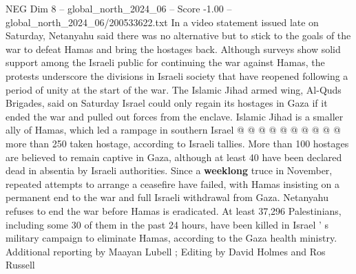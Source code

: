 \begin{textsample}{NEG Dim 8 – global\_north\_2024\_06 – Score -1.00 – global\_north\_2024\_06/200533622.txt}
In a video statement issued late on Saturday, Netanyahu said there was no alternative but to stick to the goals of the war to defeat Hamas and bring the hostages back.
Although surveys show solid support among the Israeli public for continuing the war against Hamas, the protests underscore the divisions in Israeli society that have reopened following a period of unity at the start of the war.
The Islamic Jihad armed wing, Al-Quds Brigades, said on Saturday Israel could only regain its hostages in Gaza if it ended the war and pulled out forces from the enclave.
Islamic Jihad is a smaller ally of Hamas, which led a rampage in southern Israel @ @ @ @ @ @ @ @ @ @ more than 250 taken hostage, according to Israeli tallies.
More than 100 hostages are believed to remain captive in Gaza, although at least 40 have been declared dead in absentia by Israeli authorities.
Since a \textbf{weeklong} truce in November, repeated attempts to arrange a ceasefire have failed, with Hamas insisting on a permanent end to the war and full Israeli withdrawal from Gaza.
Netanyahu refuses to end the war before Hamas is eradicated.
At least 37,296 Palestinians, including some 30 of them in the past 24 hours, have been killed in Israel ' s military campaign to eliminate Hamas, according to the Gaza health ministry.
Additional reporting by Maayan Lubell ; Editing by David Holmes and Ros Russell

\end{textsample}
